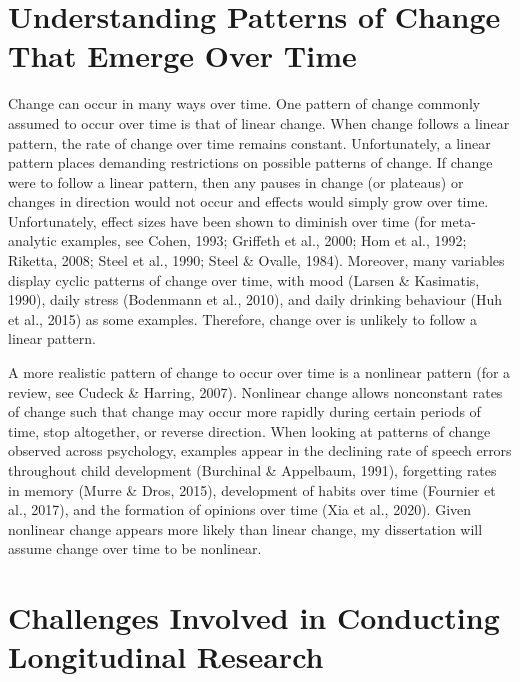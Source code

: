 \documentclass[
12pt, %
twoside,
english]{guelphthesis}
\theoremstyle{definition}
\theoremstyle{definition}
\theoremstyle{definition}
\theoremstyle{definition}
\theoremstyle{remark}
\begin{document}
\hypertarget{understanding-patterns-of-change-that-emerge-over-time}{%
\section{Understanding Patterns of Change That Emerge Over Time}\label{understanding-patterns-of-change-that-emerge-over-time}}

Change can occur in many ways over time. One pattern of change commonly assumed to occur over time is that of linear change. When change follows a linear pattern, the rate of change over time remains constant. Unfortunately, a linear pattern places demanding restrictions on possible patterns of change. If change were to follow a linear pattern, then any pauses in change (or plateaus) or changes in direction would not occur and effects would simply grow over time. Unfortunately, effect sizes have been shown to diminish over time (for meta-analytic examples, see Cohen, 1993; Griffeth et al., 2000; Hom et al., 1992; Riketta, 2008; Steel et al., 1990; Steel \& Ovalle, 1984). Moreover, many variables display cyclic patterns of change over time, with mood (Larsen \& Kasimatis, 1990), daily stress (Bodenmann et al., 2010), and daily drinking behaviour (Huh et al., 2015) as some examples. Therefore, change over is unlikely to follow a linear pattern.

A more realistic pattern of change to occur over time is a nonlinear pattern (for a review, see Cudeck \& Harring, 2007). Nonlinear change allows nonconstant rates of change such that change may occur more rapidly during certain periods of time, stop altogether, or reverse direction. When looking at patterns of change observed across psychology, examples appear in the declining rate of speech errors throughout child development (Burchinal \& Appelbaum, 1991), forgetting rates in memory (Murre \& Dros, 2015), development of habits over time (Fournier et al., 2017), and the formation of opinions over time (Xia et al., 2020). Given nonlinear change appears more likely than linear change, my dissertation will assume change over time to be nonlinear.

\hypertarget{challenges-involved-in-conducting-longitudinal-research}{%
\section{Challenges Involved in Conducting Longitudinal Research}\label{challenges-involved-in-conducting-longitudinal-research}}
\end{document}
